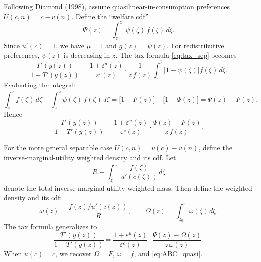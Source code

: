 \documentclass[12pt,a4paper]{article}
\theoremstyle{definition}
\theoremstyle{plain}
\theoremstyle{remark}
\newcommand{\zbar}{\bar{z}}
\newcommand{\zlow}{z_{\scriptscriptstyle 0}}
\begin{document}
Following Diamond (1998), assume quasilinear-in-consumption preferences $U(c,n) = c - v(n)$. Define the ``welfare cdf''
\[
  \Psi(z) = \int_{\zlow}^{z} \psi(\zeta) \, f(\zeta) \, d\zeta.
\]
Since $u'(c) = 1$, we have $\mu = 1$ and $g(z) = \psi(z)$. For redistributive preferences, $\psi(z)$ is decreasing in $z$. The tax formula \eqref{eq:tax_sep} becomes
\[
  \frac{T'(y(z))}{1 - T'(y(z))}
  = \frac{1+\varepsilon^u(z)}{\varepsilon^c(z)} \cdot \frac{1}{z \, f(z)}
  \int_{z}^{\zbar} \bigl[ 1 - \psi(\zeta) \bigr] f(\zeta) \, d\zeta.
\]
Evaluating the integral:
\[
  \int_{z}^{\zbar} f(\zeta) \, d\zeta - \int_{z}^{\zbar} \psi(\zeta) \, f(\zeta) \, d\zeta
  = \bigl[1 - F(z)\bigr] - \bigl[1 - \Psi(z)\bigr] = \Psi(z) - F(z).
\]
Hence
\begin{equation}
\label{eq:ABC_quasi}
  \frac{T'(y(z))}{1 - T'(y(z))} = \frac{1+\varepsilon^u(z)}{\varepsilon^c(z)} \cdot \frac{\Psi(z) - F(z)}{z \, f(z)}.
\end{equation}

For the more general separable case $U(c,n) = u(c) - v(n)$, define the inverse-marginal-utility weighted density and its cdf. Let
\[
  R \equiv \int_{\zlow}^{\zbar} \frac{f(\zeta)}{u'(c(\zeta))} \, d\zeta
\]
denote the total inverse-marginal-utility-weighted mass. Then define the weighted density and its cdf:
\[
  \omega(z) = \frac{f(z) / u'(c(z))}{R}, \qquad
  \Omega(z) = \int_{\zlow}^{z} \omega(\zeta) \, d\zeta.
\]
The tax formula generalizes to
\begin{equation}
\label{eq:ABC_separable}
  \frac{T'(y(z))}{1 - T'(y(z))} = \frac{1+\varepsilon^u(z)}{\varepsilon^c(z)} \cdot \frac{\Psi(z) - \Omega(z)}{z \, \omega(z)}.
\end{equation}
When $u(c) = c$, we recover $\Omega = F$, $\omega = f$, and \eqref{eq:ABC_quasi}.
\end{document}

